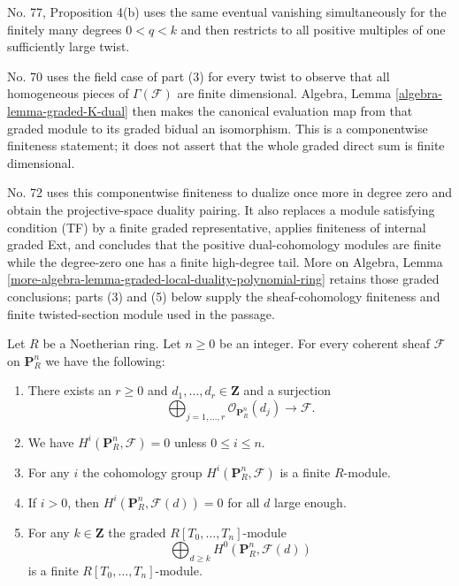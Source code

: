 \begin{lemma}
\begin{history}
No. 77, Proposition 4(b) uses the same eventual vanishing simultaneously
for the finitely many degrees $0<q<k$ and then restricts to all positive
multiples of one sufficiently large twist.

No. 70 uses the field case of part (3) for every twist to observe that all
homogeneous pieces of $\Gamma(\mathcal F)$ are finite dimensional. Algebra,
Lemma \ref{algebra-lemma-graded-K-dual} then makes the canonical evaluation
map from that graded module to its graded bidual an isomorphism. This is a
componentwise finiteness statement; it does not assert that the whole
graded direct sum is finite dimensional.

No. 72 uses this componentwise finiteness to dualize once more in degree
zero and obtain the projective-space duality pairing. It also replaces a
module satisfying condition (TF) by a finite graded representative, applies
finiteness of internal graded Ext, and concludes that the positive
dual-cohomology modules are finite while the degree-zero one has a finite
high-degree tail. More on Algebra, Lemma
\ref{more-algebra-lemma-graded-local-duality-polynomial-ring} retains those
graded conclusions; parts (3) and (5) below supply the sheaf-cohomology
finiteness and finite twisted-section module used in the passage.
\end{history}
Let $R$ be a Noetherian ring.
Let $n \geq 0$ be an integer.
For every coherent sheaf $\mathcal{F}$ on $\mathbf{P}^n_R$
we have the following:
\begin{enumerate}
\item There exists an $r \geq 0$ and
$d_1, \ldots, d_r \in \mathbf{Z}$ and a surjection
$$
\bigoplus\nolimits_{j = 1, \ldots, r}
\mathcal{O}_{\mathbf{P}^n_R}(d_j)
\longrightarrow
\mathcal{F}.
$$
\item We have $H^i(\mathbf{P}^n_R, \mathcal{F}) = 0$ unless
$0 \leq i \leq n$.
\item For any $i$ the cohomology group $H^i(\mathbf{P}^n_R, \mathcal{F})$
is a finite $R$-module.
\item If $i > 0$, then
$H^i(\mathbf{P}^n_R, \mathcal{F}(d)) = 0$ for all $d$ large enough.
\item For any $k \in \mathbf{Z}$ the graded $R[T_0, \ldots, T_n]$-module
$$
\bigoplus\nolimits_{d \geq k} H^0(\mathbf{P}^n_R, \mathcal{F}(d))
$$
is a finite $R[T_0, \ldots, T_n]$-module.
\end{enumerate}
\end{lemma}

